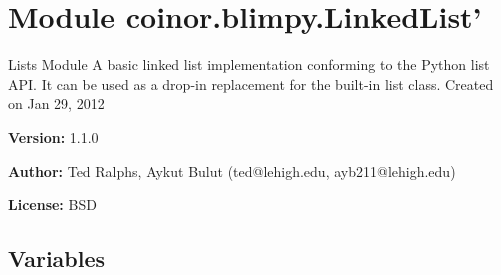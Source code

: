 %
%
%


\section{Module coinor.blimpy.LinkedList'}

    \label{coinor:blimpy:LinkedList'}
Lists Module A basic linked list implementation conforming to the Python 
list API. It can be used as a drop-in replacement for the built-in list 
class. Created on Jan 29, 2012

\textbf{Version:} 1.1.0



\textbf{Author:} Ted Ralphs, Aykut Bulut (ted@lehigh.edu, ayb211@lehigh.edu)



\textbf{License:} BSD





  \subsection{Variables}

